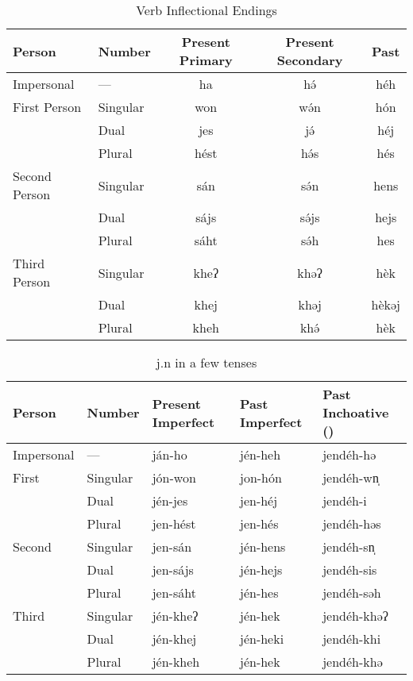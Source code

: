 \begin{table}[h]
\centering
\caption{Verb Inflectional Endings}
\label{tab:verb inflectional endings}
\begin{tabular}{ll*{3}{>{\ll}c}}
    \toprule
    Person & Number & \rm \parbox{2cm}{\centering Present Primary} & \rm
    \parbox{2cm}{\centering Present Secondary} & \rm Past \\ \midrule
    Impersonal    & —        & ha      & hə́   & héh \\ \midrule
    First Person  & Singular & won     & wə́n  & hón \\
                  & Dual     & jes     & jə́   & héj \\
                  & Plural   & hést & hə́s  & hés \\ \midrule
    Second Person & Singular & sán  & sə́n  & hens   \\
                  & Dual     & sájs & sə́js & hejs   \\
                  & Plural   & sáht & sə́h  & hes    \\ \midrule
    Third Person  & Singular & kheʔ    & khəʔ    & hèk \\
                  & Dual     & khej    & khəj    & hèkəj \\
                  & Plural   & kheh    & khə́  & hèk \\
    \bottomrule
\end{tabular}
\end{table}

\begin{table}[h]
\centering
\caption{{\ll j.n}  in a few tenses}
\begin{tabu} to 
    \toprule
    Person & Number & \rm Present Imperfect & \rm Past Imperfect & \rm Past
    Inchoative () \\ \midrule
    Impersonal & —        & ján-ho   & jén-heh  & jendéh-hə \\ \midrule
    First      & Singular & jón-won  & jon-hón  & jendéh-wn̩ \\
               & Dual     & jén-jes  & jen-héj  & jendéh-i \\
               & Plural   & jen-hést & jen-hés  & jendéh-həs \\ \midrule
    Second     & Singular & jen-sán  & jén-hens & jendéh-sn̩ \\
               & Dual     & jen-sájs & jén-hejs & jendéh-sis \\
               & Plural   & jen-sáht & jén-hes  & jendéh-səh \\ \midrule
    Third      & Singular & jén-kheʔ & jén-hek  & jendéh-khəʔ \\
               & Dual     & jén-khej & jén-heki & jendéh-khi \\
               & Plural   & jén-kheh & jén-hek  & jendéh-khə \\
    \bottomrule
\end{tabu}
\end{table}

